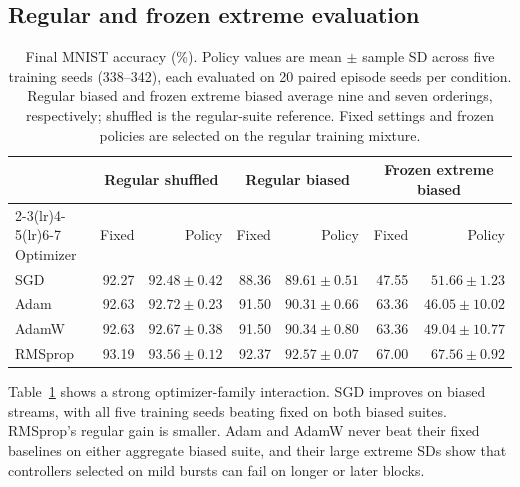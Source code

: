 \documentclass{article}
\begin{document}
\subsection{Regular and frozen extreme evaluation}
\begin{table}[t]
\centering
\caption{Final MNIST accuracy (\%). Policy values are mean $\pm$ sample SD across five training seeds (338--342), each evaluated on 20 paired episode seeds per condition. Regular biased and frozen extreme biased average nine and seven orderings, respectively; shuffled is the regular-suite reference. Fixed settings and frozen policies are selected on the regular training mixture.}
\label{tab:main}
\begin{tabular}{lrrrrrr}
\toprule
&\multicolumn{2}{c}{Regular shuffled}&\multicolumn{2}{c}{Regular biased}&\multicolumn{2}{c}{Frozen extreme biased}\\
\cmidrule(lr){2-3}\cmidrule(lr){4-5}\cmidrule(lr){6-7}
Optimizer&Fixed&Policy&Fixed&Policy&Fixed&Policy\\
\midrule
SGD&92.27&$92.48\pm0.42$&88.36&$89.61\pm0.51$&47.55&$51.66\pm1.23$\\
Adam&92.63&$92.72\pm0.23$&91.50&$90.31\pm0.66$&63.36&$46.05\pm10.02$\\
AdamW&92.63&$92.67\pm0.38$&91.50&$90.34\pm0.80$&63.36&$49.04\pm10.77$\\
RMSprop&93.19&$93.56\pm0.12$&92.37&$92.57\pm0.07$&67.00&$67.56\pm0.92$\\
\bottomrule
\end{tabular}
\end{table}
Table~\ref{tab:main} shows a strong optimizer-family interaction. SGD improves on biased streams, with all five training seeds beating fixed on both biased suites. RMSprop's regular gain is smaller. Adam and AdamW never beat their fixed baselines on either aggregate biased suite, and their large extreme SDs show that controllers selected on mild bursts can fail on longer or later blocks.
\end{document}
